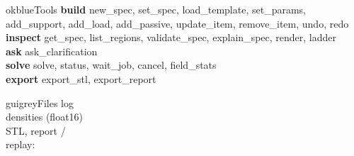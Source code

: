 {\begin{minipage}[t]{0.485\linewidth}
\begin{qrbox}{okblue}{Tools}
\textbf{build} new\_spec, set\_spec, load\_template, set\_params, add\_support, add\_load, add\_passive, update\_item,
remove\_item, undo, redo\\
\textbf{inspect} get\_spec, list\_regions, validate\_spec, explain\_spec, render, ladder\\
\textbf{ask} ask\_clarification\\
\textbf{solve} solve, status, wait\_job, cancel, field\_stats\\
\textbf{export} export\_stl, export\_report
\end{qrbox}

\begin{qrbox}{guigrey}{Files}
 \enspace log\\
 \enspace densities (float16)\\
 \enspace STL, report /\\
replay: 
\end{qrbox}
\end{minipage}
}
